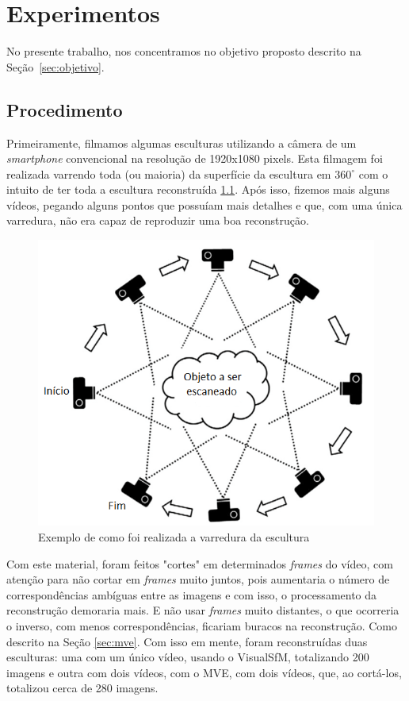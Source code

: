 \chapter{Experimentos}\label{sec:experiments}
No presente trabalho, nos concentramos no objetivo proposto descrito na Seção~\ref{sec:objetivo}.

\section{Procedimento}
Primeiramente, filmamos algumas esculturas utilizando a câmera de um \emph{smartphone} convencional na resolução de 1920x1080 pixels. Esta filmagem foi realizada varrendo toda (ou maioria) da superfície da escultura em $360^{\circ}$ com o intuito de ter toda a escultura reconstruída \ref{fig:procedimentoscan}.
Após isso, fizemos mais alguns vídeos, pegando alguns pontos que possuíam mais detalhes e que, com uma única varredura, não era capaz de reproduzir uma boa reconstrução.

\begin{figure}[!h]
	\centering
	\includegraphics[width=0.5\linewidth]{figs/procedimentoscan.png}
	\caption{%
	Exemplo de como foi realizada a varredura da escultura
	}\label{fig:procedimentoscan}
\end{figure}

Com este material, foram feitos "cortes" em determinados \emph{frames} do vídeo, com atenção para não cortar em \emph{frames} muito juntos, pois aumentaria o número de correspondências ambíguas entre as imagens e com isso, o processamento da reconstrução demoraria mais. E não usar \emph{frames} muito distantes, o que ocorreria o inverso, com menos correspondências, ficariam buracos na reconstrução. Como descrito na Seção \ref{sec:mve}.
Com isso em mente, foram reconstruídas duas esculturas: uma com um único vídeo, usando o VisualSfM, totalizando 200 imagens e outra com dois vídeos, com o MVE, com dois vídeos, que, ao cortá-los, totalizou cerca de 280 imagens.


